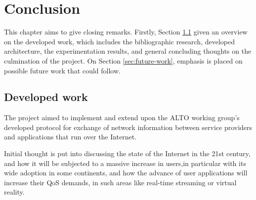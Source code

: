 \chapter{Conclusion}

    This chapter aims to give closing remarks.
    Firstly, Section \ref{sec:conclusion} given an overview on the developed work, which includes the bibliographic research, developed architecture, the experimentation results, and general concluding thoughts on the culmination of
the project.
    On Section \ref{sec:future-work}, emphasis is placed on possible future work that could follow.

\section{Developed work}

\label{sec:conclusion}

    The project aimed to implement and extend upon the ALTO working group's developed protocol for exchange of network information between service providers and
applications that run over the Internet.

    Initial thought is put into discussing the state of the Internet in the 21st century, and how it will be subjected to a massive increase in users,in particular with its wide adoption in some continents, and how the advance of user applications will increase their QoS demands, in such areas like real-time streaming or virtual reality.

